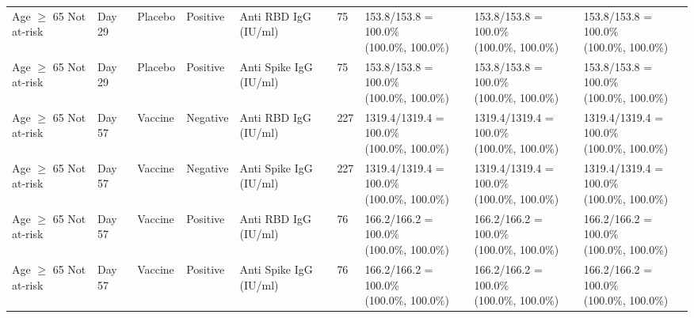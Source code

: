 \documentclass[]{book}
\theoremstyle{definition}
\theoremstyle{definition}
\theoremstyle{definition}
\newcommand{\1}{\mathbbm{1}}
\begin{document}
\begin{landscape}
\begin{ThreePartTable}
\begin{longtable}[t]{>{\raggedright\arraybackslash}p{2.7cm}llllllll}
\hspace{1em}Age $\geq$ 65 Not at-risk & Day 29 & Placebo & Positive & Anti RBD IgG (IU/ml) & 75 & \makecell[l]{153.8/153.8 = 100.0\%\\(100.0\%, 100.0\%)} & \makecell[l]{153.8/153.8 = 100.0\%\\(100.0\%, 100.0\%)} & \makecell[l]{153.8/153.8 = 100.0\%\\(100.0\%, 100.0\%)}\\
\hspace{1em}Age $\geq$ 65 Not at-risk & Day 29 & Placebo & Positive & Anti Spike IgG (IU/ml) & 75 & \makecell[l]{153.8/153.8 = 100.0\%\\(100.0\%, 100.0\%)} & \makecell[l]{153.8/153.8 = 100.0\%\\(100.0\%, 100.0\%)} & \makecell[l]{153.8/153.8 = 100.0\%\\(100.0\%, 100.0\%)}\\
\hspace{1em}Age $\geq$ 65 Not at-risk & Day 57 & Vaccine & Negative & Anti RBD IgG (IU/ml) & 227 & \makecell[l]{1319.4/1319.4 = 100.0\%\\(100.0\%, 100.0\%)} & \makecell[l]{1319.4/1319.4 = 100.0\%\\(100.0\%, 100.0\%)} & \makecell[l]{1319.4/1319.4 = 100.0\%\\(100.0\%, 100.0\%)}\\
\hspace{1em}Age $\geq$ 65 Not at-risk & Day 57 & Vaccine & Negative & Anti Spike IgG (IU/ml) & 227 & \makecell[l]{1319.4/1319.4 = 100.0\%\\(100.0\%, 100.0\%)} & \makecell[l]{1319.4/1319.4 = 100.0\%\\(100.0\%, 100.0\%)} & \makecell[l]{1319.4/1319.4 = 100.0\%\\(100.0\%, 100.0\%)}\\
\hspace{1em}Age $\geq$ 65 Not at-risk & Day 57 & Vaccine & Positive & Anti RBD IgG (IU/ml) & 76 & \makecell[l]{166.2/166.2 = 100.0\%\\(100.0\%, 100.0\%)} & \makecell[l]{166.2/166.2 = 100.0\%\\(100.0\%, 100.0\%)} & \makecell[l]{166.2/166.2 = 100.0\%\\(100.0\%, 100.0\%)}\\
\hspace{1em}Age $\geq$ 65 Not at-risk & Day 57 & Vaccine & Positive & Anti Spike IgG (IU/ml) & 76 & \makecell[l]{166.2/166.2 = 100.0\%\\(100.0\%, 100.0\%)} & \makecell[l]{166.2/166.2 = 100.0\%\\(100.0\%, 100.0\%)} & \makecell[l]{166.2/166.2 = 100.0\%\\(100.0\%, 100.0\%)}\\

\end{longtable}
\end{ThreePartTable}
\end{landscape}
\end{document}

